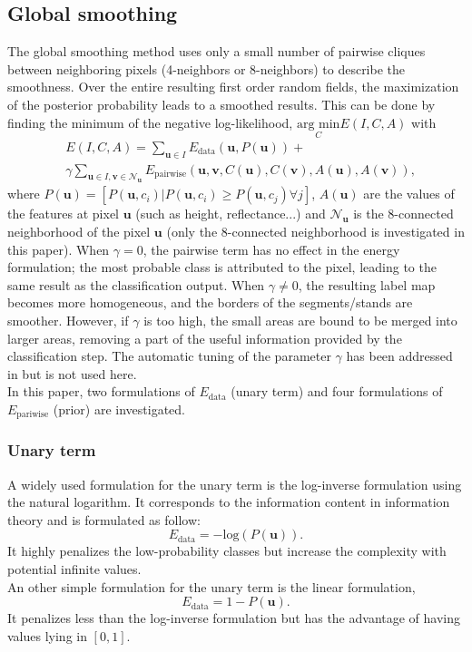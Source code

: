 \subsection{Global smoothing}
The global smoothing method uses only a small number of pairwise cliques between neighboring pixels (4-neighbors or 8-neighbors) to describe the smoothness. Over the entire resulting first order random fields, the maximization of the posterior probability leads to a smoothed results. This can be done by finding the minimum of the negative log-likelihood, $\underset{C}{\text{arg min}}E(I,C,A)$ with
\begin{equation}
\begin{aligned}
& E(I,C,A)=\sum_{\mathbf{u}\in I}E_{\text{data}}(\mathbf{u},P(\mathbf{u})) + \\
& \gamma\sum_{\mathbf{u} \in I, \mathbf{v} \in \mathcal{N}_{\mathbf{u}}} E_{\text{pairwise}}(\mathbf{u}, \mathbf{v}, C(\mathbf{u}), C(\mathbf{v}), A(\mathbf{u}), A(\mathbf{v})),
\end{aligned}
\end{equation}
where $P(\mathbf{u})=[P(\mathbf{u},c_{i})|P(\mathbf{u},c_{i}) \geq P(\mathbf{u},c_{j}) \forall j]$, $A(\mathbf{u})$ are the values of the features at pixel $\mathbf{u}$ (such as height, reflectance...) and $\mathcal{N}_{\mathbf{u}}$ is the 8-connected neighborhood of the pixel $\mathbf{u}$ (only the 8-connected neighborhood is investigated in this paper). When $\gamma=0$, the pairwise term has no effect in the energy formulation; the most probable class is attributed to the pixel, leading to the same result as the classification output. When $\gamma \neq 0$, the resulting label map becomes more homogeneous, and the borders of the segments/stands are smoother. However, if $\gamma$ is too high, the small areas are bound to be merged into larger areas, removing a part of the useful information provided by the classification step. The automatic tuning of the parameter $\gamma$ has been addressed in \cite{Gab_MRF} but is not used here.\\
In this paper, two formulations of $E_{\text{data}}$ (unary term) and four formulations of $E_{\text{pariwise}}$ (prior) are investigated. \\
\subsubsection{Unary term}
A widely used formulation for the unary term is the log-inverse formulation using the natural logarithm. It corresponds to the information content in information theory and is formulated as follow:
\begin{equation}
E_{\text{data}}=-\text{log}(P(\mathbf{u})).
\label{eq:data1}
\end{equation}
It highly penalizes the low-probability classes but increase the complexity with potential infinite values.\\
An other simple formulation for the unary term is the linear formulation,
\begin{equation}
E_{\text{data}}=1-P(\mathbf{u}).
\label{eq:data2}
\end{equation}
It penalizes less than the log-inverse formulation but has the advantage of having values lying in $[0,1]$. \\
